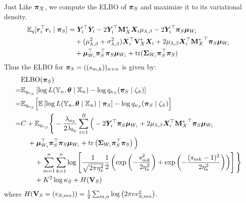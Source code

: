 \documentclass[numsec,webpdf,modern,medium,namedate]{oup-authoring-template}
\theoremstyle{thmstyleone}%
\theoremstyle{thmstyletwo}%
\theoremstyle{thmstylethree}%
\begin{document}
Just Like $\boldsymbol{\pi}_X$, we compute the ELBO of $\boldsymbol{\pi}_S$ and maximize it to its variational density.
\begin{align*}
\mathbb{E}_q[\boldsymbol{r}_i^\top \boldsymbol{r}_i \mid \boldsymbol{\pi}_S] &= \boldsymbol{Y}_i^\top \boldsymbol{Y}_i 
- 2 \boldsymbol{Y}_i^\top \mathbf{M}_X^\ast \boldsymbol{X}_i \mu_{\lambda, \beta} 
- 2 \boldsymbol{Y}_i^\top \boldsymbol{\pi}_S \boldsymbol{\mu}_{W_i} \\
&\quad + (\mu_{\lambda, \beta}^2 + \sigma^2_{\lambda, \beta}) \boldsymbol{X}_i^\top \mathbf{V}^\ast_X \boldsymbol{X}_i 
+ 2 \mu_{\lambda, \beta} \boldsymbol{X}_i^\top {\mathbf{M}^\ast_X}^\top \boldsymbol{\pi}_S \boldsymbol{\mu}_{W_i} \\
&\quad + \boldsymbol{\mu}_{W_i}^\top \boldsymbol{\pi}_S^\top \boldsymbol{\pi}_S \boldsymbol{\mu}_{W_i} 
+ \mathrm{tr}(\boldsymbol{\Sigma}_{W_i} \boldsymbol{\pi}_S^\top \boldsymbol{\pi}_S)
\end{align*}
Thus the ELBO for $\boldsymbol{\pi}_S = ((s_{m,k}))_{n \times n}$ is given by:
\begin{align*}
& \text{ELBO}(\boldsymbol{\pi}_S)\\
= & \mathbb{E}_{q_{\kappa_S}}\left[\log L(\mathbb{Y}_n, \boldsymbol{\theta} \mid \mathbb{X}_n) - \log q_{\kappa_S}(\boldsymbol{\pi}_S\mid \zeta_S)\right] \\
= & \mathbb{E}_{q_{\kappa_S}}\Big[ \mathbb{E}\left[\log L(\mathbb{Y}_n, \boldsymbol{\theta} \mid \mathbb{X}_n) \mid \boldsymbol{\pi}_S\right]
- \log q_{\kappa_S}(\boldsymbol{\pi}_S\mid \zeta_S) \Big] \\
= & C 
+ \mathbb{E}_{q_{\kappa_S}}\Bigg\{ -\frac{\lambda_{a_2}}{2\lambda_{b_2}} \sum_{i = 1}^B\Big(
- 2 \boldsymbol{Y}_i^\top \boldsymbol{\pi}_S \boldsymbol{\mu}_{W_i} 
+ 2 \mu_{\lambda, \beta} \boldsymbol{X}_i^\top {\mathbf{M}^\ast_X}^\top \boldsymbol{\pi}_S \boldsymbol{\mu}_{W_i} \\
&\quad + \boldsymbol{\mu}_{W_i}^\top \boldsymbol{\pi}_S^\top \boldsymbol{\pi}_S \boldsymbol{\mu}_{W_i} 
+ \mathrm{tr}\left(\boldsymbol{\Sigma}_{W_i} \boldsymbol{\pi}_S^\top \boldsymbol{\pi}_S\right) \Big) \\
&\qquad + \sum_{m=1}^n \sum_{k=1}^n \log \left[ \frac{1}{\sqrt{2\pi \eta_s^2}} \frac{1}{2}
\left( \exp\left( -\frac{s_{mk}^2}{2 \eta_s^2} \right) 
+ \exp\left( -\frac{(s_{mk}-1)^2}{2 \eta_s^2} \right) \right) \right] \Bigg\} \\
&\qquad + K^2 \log \kappa_S + H(\mathbf{V}_S)
\end{align*}
where $H(\mathbf{V}_S = (v_{S,mn})) = 
\frac{1}{2} \sum_{m,n} \log \left(2\pi e v^2_{S,mn}\right)$.
\end{document}
